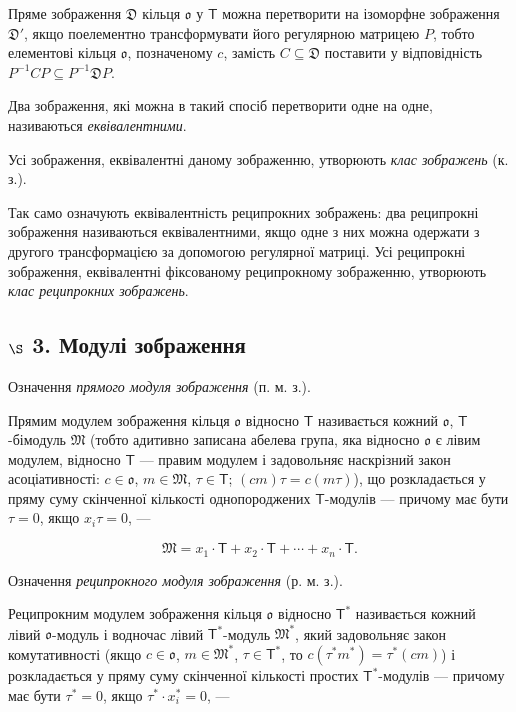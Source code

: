 \documentclass[11pt]{article}
\begin{document}
Пряме зображення \(\mathfrak D\) кільця \(\mathfrak{o}\) у \(\mathsf T\) можна перетворити на ізоморфне зображення \(\mathfrak D'\), якщо поелементно трансформувати його регулярною матрицею \(P\), тобто елементові кільця \(\mathfrak{o}\), позначеному \(c\), замість \(C\subseteq\mathfrak D\) поставити у відповідність \(P^{-1}CP\subseteq P^{-1}\mathfrak D P\).

Два зображення, які можна в такий спосіб перетворити одне на одне, називаються \emph{еквівалентними}.

Усі зображення, еквівалентні даному зображенню, утворюють \emph{клас зображень} (к. з.).

Так само означують еквівалентність реципрокних зображень: два реципрокні зображення називаються еквівалентними, якщо одне з них можна одержати з другого трансформацією за допомогою регулярної матриці. Усі реципрокні зображення, еквівалентні фіксованому реципрокному зображенню, утворюють \emph{клас реципрокних зображень}.

\subsection*{\texorpdfstring{\(\S\) 3. Модулі зображення}{\textbackslash S 3. Модулі зображення}}\label{s-3.-darstellungsmoduln}

Означення \emph{прямого модуля зображення} (п. м. з.).

Прямим модулем зображення кільця \(\mathfrak{o}\) відносно \(\mathsf T\) називається кожний \(\mathfrak{o}\), \(\mathsf T\)-бімодуль \(\mathfrak M\) (тобто адитивно записана абелева група, яка відносно \(\mathfrak{o}\) є лівим модулем, відносно \(\mathsf T\) --- правим модулем і задовольняє наскрізний закон асоціативності: \(c\in\mathfrak{o}\), \(m\in\mathfrak M\), \(\tau\in\mathsf T\); \((cm)\tau=c(m\tau)\)), що розкладається у пряму суму скінченної кількості однопороджених \(\mathsf T\)-модулів --- причому має бути \(\tau=0\), якщо \(x_i\tau=0\), ---

\[
\mathfrak M=x_1\cdot\mathsf T+x_2\cdot\mathsf T+\cdots+x_n\cdot\mathsf T.
\]

Означення \emph{реципрокного модуля зображення} (р. м. з.).

Реципрокним модулем зображення кільця \(\mathfrak{o}\) відносно \(\mathsf T^*\) називається кожний лівий \(\mathfrak{o}\)-модуль і водночас лівий \(\mathsf T^*\)-модуль \(\mathfrak M^*\), який задовольняє закон комутативності (якщо \(c\in\mathfrak{o}\), \(m\in\mathfrak M^*\), \(\tau\in\mathsf T^*\), то \(c(\tau^*m^*)=\tau^*(cm)\)) і розкладається у пряму суму скінченної кількості простих \(\mathsf T^*\)-модулів --- причому має бути \(\tau^*=0\), якщо \(\tau^*\cdot x_i^*=0\), ---
\end{document}
